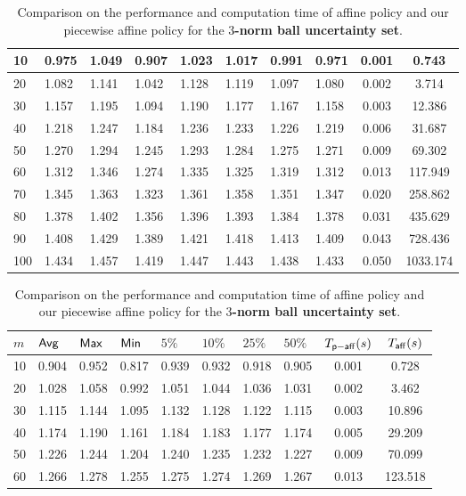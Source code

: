 \documentclass[11pt]{article}
\theoremstyle{plain}
\theoremstyle{definition}
\numberwithin{equation}{section}%
\numberwithin{equation}{section}%
\begin{document}
\begin{table}[]
{\begin{tabular}{|l|l|l|l|l|l|l|l|c|c|}
10  & 0.975 & 1.049 & 0.907 & 1.023 & 1.017 & 0.991 & 0.971 & 0.001 & 0.743    \\\hline
20  & 1.082 & 1.141 & 1.042 & 1.128 & 1.119 & 1.097 & 1.080 & 0.002 & 3.714    \\\hline
30  & 1.157 & 1.195 & 1.094 & 1.190 & 1.177 & 1.167 & 1.158 & 0.003 & 12.386   \\\hline
40  & 1.218 & 1.247 & 1.184 & 1.236 & 1.233 & 1.226 & 1.219 & 0.006 & 31.687   \\\hline
50  & 1.270 & 1.294 & 1.245 & 1.293 & 1.284 & 1.275 & 1.271 & 0.009 & 69.302   \\\hline
60  & 1.312 & 1.346 & 1.274 & 1.335 & 1.325 & 1.319 & 1.312 & 0.013 & 117.949  \\\hline
70  & 1.345 & 1.363 & 1.323 & 1.361 & 1.358 & 1.351 & 1.347 & 0.020 & 258.862  \\\hline
80  & 1.378 & 1.402 & 1.356 & 1.396 & 1.393 & 1.384 & 1.378 & 0.031 & 435.629  \\\hline
90  & 1.408 & 1.429 & 1.389 & 1.421 & 1.418 & 1.413 & 1.409 & 0.043 & 728.436  \\\hline
100 & 1.434 & 1.457 & 1.419 & 1.447 & 1.443 & 1.438 & 1.433 & 0.050 & 1033.174 \\\hline
\end{tabular}%
\caption{Comparison on the performance and computation time of affine policy and our piecewise affine policy for the {\bf $3$-norm ball uncertainty set}.}
\label{tab:simu:3ball}
\bigskip
\begin{tabular}{|l|l|l|l|l|l|l|l|c|c|}
\hline
$m$ & ${\sf Avg}$ &  ${\sf Max}$& ${\sf Min}$ &   $5\%$ & $10\%$ &  $25\%$  & $50\%$  & $T_{\sf p-aff}(s)$ & $T_{\sf aff}(s)$\\ \hline
10  & 0.904 & 0.952 & 0.817 & 0.939 & 0.932 & 0.918 & 0.905 & 0.001 & 0.728   \\\hline
20  & 1.028 & 1.058 & 0.992 & 1.051 & 1.044 & 1.036 & 1.031 & 0.002 & 3.462   \\\hline
30  & 1.115 & 1.144 & 1.095 & 1.132 & 1.128 & 1.122 & 1.115 & 0.003 & 10.896  \\\hline
40  & 1.174 & 1.190 & 1.161 & 1.184 & 1.183 & 1.177 & 1.174 & 0.005 & 29.209  \\\hline
50  & 1.226 & 1.244 & 1.204 & 1.240 & 1.235 & 1.232 & 1.227 & 0.009 & 70.099  \\\hline
60  & 1.266 & 1.278 & 1.255 & 1.275 & 1.274 & 1.269 & 1.267 & 0.013 & 123.518 \\\hline

\end{tabular}}
\end{table}
\end{document}
